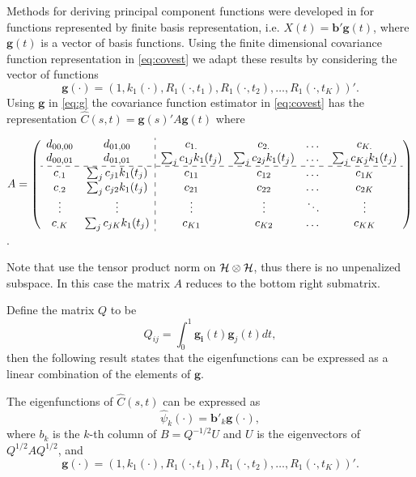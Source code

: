 Methods for deriving principal component functions were developed in \cite{FDA} for functions represented by finite basis representation, i.e. $X(t) = \mathbf{b}'\mathbf{g}(t)$, where $\mathbf{g}(t)$ is a vector of basis functions. Using the finite dimensional covariance function representation in \eqref{eq:covest} we adapt these results by considering the vector of functions 
\begin{equation}
\mathbf{g(\cdot)}=(1, k_1(\cdot),R_{1}(\cdot, t_1),R_{1}(\cdot, t_2),\dots, R_{1}(\cdot, t_K))'.
\label{eq:g}
\end{equation}
Using $\mathbf{g}$ in \eqref{eq:g} the covariance function estimator in \eqref{eq:covest} has the representation $\hat{C}(s,t)= \mathbf{g}(s)'A\mathbf{g}(t)$ where
\vspace{0.8cm}
\begin{center}
 $A = \left(\begin{array}{cc:cccc}
d_{00,00} & d_{01,00} & c_{1.} & c_{2.} & \dots & c_{K.}\\
d_{00,01} & d_{01,01} & \sum_j c_{1j}k_1(t_j) & \sum_j c_{2j}k_1(t_j) & \dots & \sum_j c_{Kj}k_1(t_j)\\
\hdashline
c_{.1}   & \sum_j c_{j1}k_1(t_j) & c_{11}   & c_{12}   & \dots & c_{1K}\\
c_{.2}   & \sum_j c_{j2}k_1(t_j) & c_{21}   & c_{22}   & \dots & c_{2K}\\
\vdots  & \vdots                            & \vdots    & \vdots & \ddots    & \vdots \\
c_{.K}   & \sum_j c_{jK}k_1(t_j) & c_{K1}   & c_{K2}   & \dots & c_{KK}
\end{array}\right)$.
\end{center}
\vspace{0.8cm}
Note that  \cite{Cai:2010vr} use the tensor product norm on $\mathcal{H}\otimes \mathcal{H}$, thus there is no unpenalized subspace. In this case the matrix $A$ reduces to the bottom right submatrix. 

Define the matrix $Q$ to be
\begin{equation*}
	Q_{ij} = \int_0^1\mathbf{g_i}(t)\mathbf{g}_j(t)dt,
\end{equation*}
then the following result states that the eigenfunctions can be expressed as a linear combination of the elements of $\mathbf{g}$.
\begin{lemma} \label{thm:eigenfunctions}
	The eigenfunctions of $\hat{C}(s,t)$ can be expressed as
	\begin{equation*}
		\hat{\psi}_k(\cdot) = \mathbf{b}'_k\mathbf{g}(\cdot),	
	\end{equation*}
	where $b_k$ is the $k$-th column of $B=Q^{-1/2}U$ and $U$ is the eigenvectors of $Q^{1/2}AQ^{1/2}$, and 
\[
\mathbf{g(\cdot)}=(1, k_1(\cdot),R_{1}(\cdot, t_1),R_{1}(\cdot, t_2),\dots, R_{1}(\cdot, t_K))'.
\]
\end{lemma}


